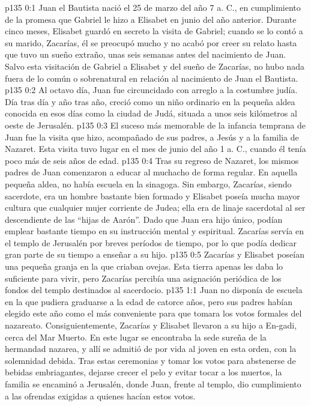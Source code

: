 \author{Comisión de seres intermedios}
\vs p135 0:1 Juan el Bautista nació el 25 de marzo del año 7 a. C., en cumplimiento de la promesa que Gabriel le hizo a Elisabet en junio del año anterior. Durante cinco meses, Elisabet guardó en secreto la visita de Gabriel; cuando se lo contó a su marido, Zacarías, él se preocupó mucho y no acabó por creer su relato hasta que tuvo un sueño extraño, unas seis semanas antes del nacimiento de Juan. Salvo esta visitación de Gabriel a Elisabet y del sueño de Zacarías, no hubo nada fuera de lo común o sobrenatural en relación al nacimiento de Juan el Bautista.
\vs p135 0:2 Al octavo día, Juan fue circuncidado con arreglo a la costumbre judía. Día tras día y año tras año, creció como un niño ordinario en la pequeña aldea conocida en esos días como la ciudad de Judá, situada a unos seis kilómetros al oeste de Jerusalén.
\vs p135 0:3 El suceso más memorable de la infancia temprana de Juan fue la visita que hizo, acompañado de sus padres, a Jesús y a la familia de Nazaret. Esta visita tuvo lugar en el mes de junio del año 1 a. C., cuando él tenía poco más de seis años de edad.
\vs p135 0:4 Tras su regreso de Nazaret, los mismos padres de Juan comenzaron a educar al muchacho de forma regular. En aquella pequeña aldea, no había escuela en la sinagoga. Sin embargo, Zacarías, siendo sacerdote, era un hombre bastante bien formado y Elisabet poseía mucha mayor cultura que cualquier mujer corriente de Judea; ella era de linaje sacerdotal al ser descendiente de las “hijas de Aarón”. Dado que Juan era hijo único, podían emplear bastante tiempo en su instrucción mental y espiritual. Zacarías servía en el templo de Jerusalén por breves períodos de tiempo, por lo que podía dedicar gran parte de su tiempo a enseñar a su hijo.
\vs p135 0:5 Zacarías y Elisabet poseían una pequeña granja en la que criaban ovejas. Esta tierra apenas les daba lo suficiente para vivir, pero Zacarías percibía una asignación periódica de los fondos del templo destinados al sacerdocio.
\vs p135 1:1 Juan no disponía de escuela en la que pudiera graduarse a la edad de catorce años, pero sus padres habían elegido este año como el más conveniente para que tomara los votos formales del nazareato. Consiguientemente, Zacarías y Elisabet llevaron a su hijo a En\hyp{}gadi, cerca del Mar Muerto. En este lugar se encontraba la sede sureña de la hermandad nazarea, y allí se admitió de por vida al joven en esta orden, con la solemnidad debida. Tras estas ceremonias y tomar los votos para abstenerse de bebidas embriagantes, dejarse crecer el pelo y evitar tocar a los muertos, la familia se encaminó a Jerusalén, donde Juan, frente al templo, dio cumplimiento a las ofrendas exigidas a quienes hacían estos votos.
